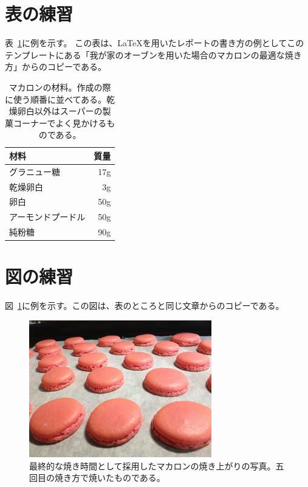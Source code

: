 \documentclass[uplatex,dvipdfmx,a4j,12pt]{jsarticle}
\begin{document}
\section{表の練習}


表~\ref{table:recipe}に例を示す。
この表は、LaTeXを用いたレポートの書き方の例としてこのテンプレートにある「我が家のオーブンを用いた場合のマカロンの最適な焼き方」からのコピーである。

\begin{table}[t]
    \centering
    \caption{マカロンの材料。作成の際に使う順番に並べてある。乾燥卵白以外はスーパーの製菓コーナーでよく見かけるものである。}
    \begin{tabular}{lr}
        材料              & 質量 \\
        \hline
        グラニュー糖      & 17g \\
        乾燥卵白         & 3g \\
        卵白             & 50g \\
        アーモンドプードル & 50g \\
        純粉糖 & 90g \\
        \hline
    \end{tabular}
    \label{table:recipe}
\end{table}

\section{図の練習}

図~\ref{fig:fig06}に例を示す。この図は、表のところと同じ文章からのコピーである。

\begin{figure}[b]
    \centering
    \includegraphics[width=0.3\linewidth]{fig06.jpg}
    \caption{最終的な焼き時間として採用したマカロンの焼き上がりの写真。五回目の焼き方で焼いたものである。}
    \label{fig:fig06}
\end{figure}
\end{document}
